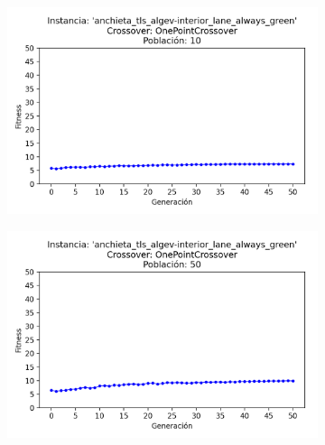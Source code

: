 \begin{figure}[h]
    \centering
    \begin{subfigure}[t]{.49\textwidth}
      \centering
      \includegraphics[width=\textwidth]{report/images/estudio/anchieta_tls_algev-interior_lane_always_green-OnePointCrossover-10.png}
    \end{subfigure}
    \hfill
    \begin{subfigure}[t]{.49\textwidth}
      \centering
      \includegraphics[width=\textwidth]{report/images/estudio/anchieta_tls_algev-interior_lane_always_green-OnePointCrossover-50.png}
    \end{subfigure}
    \vspace{0.7cm}
    \begin{subfigure}[t]{.49\textwidth}

\end{subfigure}
\end{figure}
